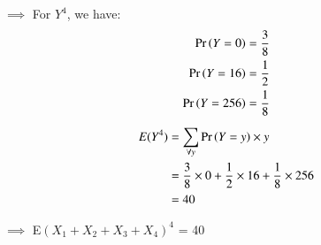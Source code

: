 \documentclass[journal,12pt,twocolumn]{IEEEtran}
\theoremstyle{definition}
\begin{document}
$\implies$ For $Y^4$, we have:
\begin{align}
    \Pr\left(Y = 0\right) =\frac{3}{8}\\
    \Pr\left(Y = 16\right) =\frac{1}{2}\\
    \Pr\left(Y = 256\right) =\frac{1}{8}
\end{align}
\begin{align}
E(Y^4) &= \sum_{\forall y}^{} \Pr\left(Y=y\right) \times y\\
&= \frac{3}{8} \times 0 + \frac{1}{2} \times 16 + \frac{1}{8} \times 256\\
&= 40
\end{align}
\begin{center}
   $\implies$ E$(X_1 + X_2 + X_3 + X_4)^4$ = 40 
\end{center}
\bigskip
{}
\end{document}

